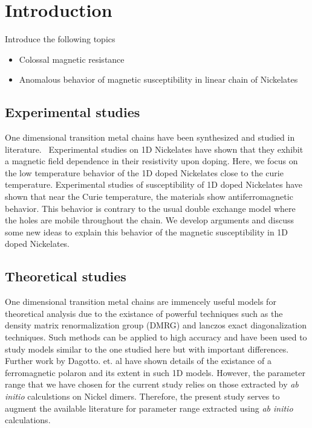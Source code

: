\documentclass[12pt,twoside]{report}
\begin{document}
	\setcounter{page}{1}
	\tableofcontents
	\chapter*{Introduction}
	
	Introduce the following topics
	\begin{itemize}
		\item Colossal magnetic resistance
		\item Anomalous behavior of magnetic susceptibility in linear chain of Nickelates
	\end{itemize}
	
	\section*{Experimental studies}
	
	One dimensional transition metal chains have been synthesized and studied in
	literature.~\cite{darriet_compound_1993,batlogg_haldane_1994} Experimental
	studies on 1D Nickelates have shown that they exhibit a magnetic field
	dependence in their resistivity upon doping.\cite{xu_holes_2000} Here, we focus
	on the low temperature behavior of the 1D doped Nickelates close to the curie
	temperature. Experimental studies of susceptibility of 1D doped Nickelates have
	shown that near the Curie temperature, the materials show antiferromagnetic
	behavior.\cite{Ramirez} This behavior is contrary to the usual double exchange
	model where the holes are mobile throughout the chain. We develop arguments and
	discuss some new ideas to explain this behavior of the magnetic susceptibility
	in 1D doped Nickelates.
	
	\section*{Theoretical studies}
	
	One dimensional transition metal chains are immencely useful models
	for theoretical analysis due to the existance of powerful techniques
	such as the density matrix renormalization group (DMRG) and lanczos
	exact diagonalization techniques. Such methods can be applied to
	high accuracy and have been used to study models similar to the
	one studied here but with important differences.\cite{dagotto_correlated_1994,patel_emergence_2020}
	Further work by Dagotto. et. al have shown details of the existance
	of a ferromagnetic polaron and its extent in such 1D models.\cite{malvezzi_origin_2001} However, the parameter range
	that we have chosen for the current study relies on those extracted
	by \textit{ab initio} calculstions on Nickel dimers.\cite{bastardis_microscopic_2007,bastardis_isotropic_2008}
	Therefore, the present study serves to augment the available literature
	for parameter range extracted using \textit{ab initio} calculations.
	
\end{document}
